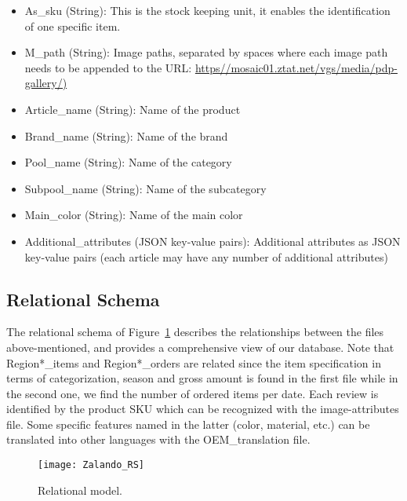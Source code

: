 \begin{itemize}
    \item As\_sku (String): This is the stock keeping unit, it enables the identification of one specific item.
    \item M\_path (String): Image paths, separated by spaces where each image path needs to be appended to the URL: \url{https//mosaic01.ztat.net/vgs/media/pdp-gallery/)}
    \item  Article\_name (String): Name of the product
    \item Brand\_name (String): Name of the brand
    \item Pool\_name (String): Name of the category
    \item Subpool\_name (String): Name of the subcategory
    \item Main\_color (String):  Name of the main color
    \item Additional\_attributes (JSON key-value pairs): Additional attributes as JSON key-value pairs (each article may have any number of additional attributes)
\end{itemize}

\subsection{Relational Schema}

The relational schema of Figure~\ref{fig:model_rs} describes the relationships between the files  above-mentioned, and provides a comprehensive view of our database. Note that Region*\_items and Region*\_orders are related since the item specification in terms of categorization, season and gross amount is found in the first file while in the second one, we find the number of ordered items per date. Each review is identified by the product SKU which can be recognized with the image-attributes file. Some specific features named in the latter (color, material, etc.) can be translated into other languages with the OEM\_translation file. 



\begin{figure}[htb] \centering 
  \texttt{[image: Zalando\_RS]}
  \caption{Relational model.}
  \label{fig:model_rs}
\end{figure}


